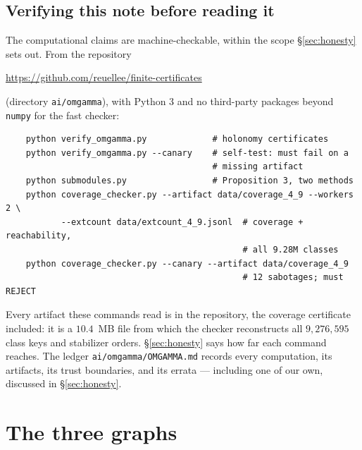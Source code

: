 \documentclass[11pt]{amsart}
\theoremstyle{remark}
\begin{document}
\subsection*{Verifying this note before reading it}
The computational claims are machine-checkable, within the scope
\S\ref{sec:honesty} sets out. From the repository
\begin{center}
\url{https://github.com/reuellee/finite-certificates}
\end{center}
(directory \texttt{ai/omgamma}), with Python 3 and no third-party
packages beyond \texttt{numpy} for the fast checker:
\begin{verbatim}
    python verify_omgamma.py             # holonomy certificates
    python verify_omgamma.py --canary    # self-test: must fail on a
                                         # missing artifact
    python submodules.py                 # Proposition 3, two methods
    python coverage_checker.py --artifact data/coverage_4_9 --workers 2 \
           --extcount data/extcount_4_9.jsonl  # coverage + reachability,
                                               # all 9.28M classes
    python coverage_checker.py --canary --artifact data/coverage_4_9
                                               # 12 sabotages; must REJECT
\end{verbatim}
Every artifact these commands read is in the repository, the coverage
certificate included: it is a $10.4$~MB file from which the checker
reconstructs all $9{,}276{,}595$ class keys and stabilizer orders.
\S\ref{sec:honesty} says how far each command reaches.
The ledger \texttt{ai/omgamma/OMGAMMA.md} records every computation, its
artifacts, its trust boundaries, and its errata --- including one of our
own, discussed in \S\ref{sec:honesty}.

\section{The three graphs}\label{sec:defs}
\end{document}
